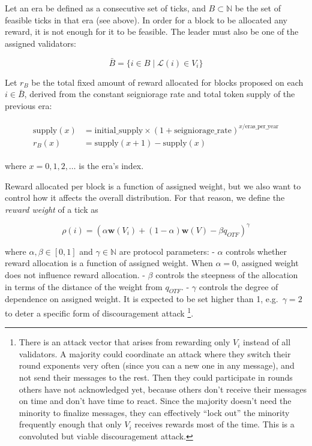 \documentclass[12pt]{article}
\begin{document}
Let an era be defined as a consecutive set of ticks, and $B\subset\mathbb{N}$ be the set of feasible ticks in that era (see above). In order for a block to be allocated any reward, it is not enough for it to be feasible. The leader must also be one of the assigned validators:

\begin{equation}
\bar{B}=\{i\in B \mid \mathcal{L}(i) \in V_i\}
\end{equation}

Let $r_B$ be the total fixed amount of reward allocated for blocks proposed on each $i\in \bar{B}$, derived from the constant seigniorage rate and total token supply of the previous era:

\begin{equation}
\begin{split}\begin{aligned}
\text{supply}(x) &= \text{initial}\_\text{supply}\times (1+\text{seigniorage}\_\text{rate})^{x/\text{eras}\_\text{per}\_\text{year}} \\
r_B(x) &= \text{supply}(x+1) - \text{supply}(x)
\end{aligned}\end{split}
\end{equation}

where $x=0,1,2,\dots$ is the era's index.

Reward allocated per block is a function of assigned weight, but we also want to control how it affects the overall distribution. For that reason, we define the \emph{reward weight} of a tick as

\begin{equation}
  \rho(i) = (\alpha\boldsymbol{w}(V_i)+(1-\alpha)\boldsymbol{w}(V)-\beta q_{OTF})^\gamma
\end{equation}

where $\alpha,\beta\in [0,1]$ and $\gamma\in\mathbb{N}$ are protocol parameters: - $\alpha$ controls whether reward allocation is a function of assigned weight. When $\alpha=0$, assigned weight does not influence reward allocation. - $\beta$ controls the steepness of the allocation in terms of the distance of the weight from $q_{OTF}$. - $\gamma$ controls the degree of dependence on assigned weight. It is expected to be set higher than 1, e.g.~$\gamma=2$ to deter a specific form of discouragement attack \footnote{There is an attack vector that arises from rewarding only $V_i$ instead of all validators. A majority could coordinate an attack where they switch their round exponents very often (since you can a new one in any message), and not send their messages to the rest. Then they could participate in rounds others have not acknowledged yet, because others don't receive their messages on time and don't have time to react. Since the majority doesn't need the minority to finalize messages, they can effectively ``lock out'' the minority frequently enough that only $V_i$ receives rewards most of the time. This is a convoluted but viable discouragement attack.}.
\end{document}
